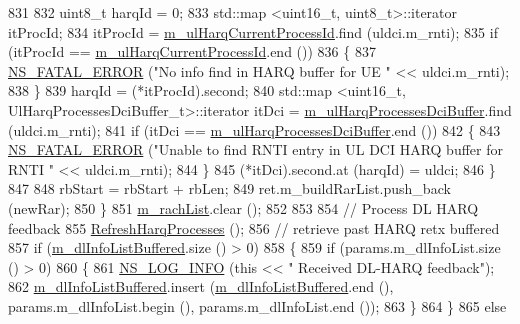 \begin{DoxyCode}
831 
832           uint8\_t harqId = 0;
833           std::map <uint16\_t, uint8\_t>::iterator itProcId;
834           itProcId = \hyperlink{classns3_1_1FdTbfqFfMacScheduler_a36b22976070611aa3fdd5c573f891dc2}{m\_ulHarqCurrentProcessId}.find (uldci.m\_rnti);
835           \textcolor{keywordflow}{if} (itProcId == \hyperlink{classns3_1_1FdTbfqFfMacScheduler_a36b22976070611aa3fdd5c573f891dc2}{m\_ulHarqCurrentProcessId}.end ())
836             \{
837               \hyperlink{group__fatal_ga5131d5e3f75d7d4cbfd706ac456fdc85}{NS\_FATAL\_ERROR} (\textcolor{stringliteral}{"No info find in HARQ buffer for UE "} << uldci.m\_rnti);
838             \}
839           harqId = (*itProcId).second;
840           std::map <uint16\_t, UlHarqProcessesDciBuffer\_t>::iterator itDci = 
      \hyperlink{classns3_1_1FdTbfqFfMacScheduler_a8566c4093902c1a4c227fa795fa90756}{m\_ulHarqProcessesDciBuffer}.find (uldci.m\_rnti);
841           \textcolor{keywordflow}{if} (itDci == \hyperlink{classns3_1_1FdTbfqFfMacScheduler_a8566c4093902c1a4c227fa795fa90756}{m\_ulHarqProcessesDciBuffer}.end ())
842             \{
843               \hyperlink{group__fatal_ga5131d5e3f75d7d4cbfd706ac456fdc85}{NS\_FATAL\_ERROR} (\textcolor{stringliteral}{"Unable to find RNTI entry in UL DCI HARQ buffer for RNTI "} << 
      uldci.m\_rnti);
844             \}
845           (*itDci).second.at (harqId) = uldci;
846         \}
847 
848       rbStart = rbStart + rbLen;
849       ret.m\_buildRarList.push\_back (newRar);
850     \}
851   \hyperlink{classns3_1_1FdTbfqFfMacScheduler_a0d2d08dad69997d048c8d35b5dac76e7}{m\_rachList}.clear ();
852 
853 
854   \textcolor{comment}{// Process DL HARQ feedback}
855   \hyperlink{classns3_1_1FdTbfqFfMacScheduler_a3c8688dfe09de01251cc4d15a4f620c6}{RefreshHarqProcesses} ();
856   \textcolor{comment}{// retrieve past HARQ retx buffered}
857   \textcolor{keywordflow}{if} (\hyperlink{classns3_1_1FdTbfqFfMacScheduler_a72f4bdca7a08fcc26b1618bb9e2d0cf3}{m\_dlInfoListBuffered}.size () > 0)
858     \{
859       \textcolor{keywordflow}{if} (params.m\_dlInfoList.size () > 0)
860         \{
861           \hyperlink{group__logging_gafbd73ee2cf9f26b319f49086d8e860fb}{NS\_LOG\_INFO} (\textcolor{keyword}{this} << \textcolor{stringliteral}{" Received DL-HARQ feedback"});
862           \hyperlink{classns3_1_1FdTbfqFfMacScheduler_a72f4bdca7a08fcc26b1618bb9e2d0cf3}{m\_dlInfoListBuffered}.insert (\hyperlink{classns3_1_1FdTbfqFfMacScheduler_a72f4bdca7a08fcc26b1618bb9e2d0cf3}{m\_dlInfoListBuffered}.end (),
       params.m\_dlInfoList.begin (), params.m\_dlInfoList.end ());
863         \}
864     \}
865   \textcolor{keywordflow}{else}

\end{DoxyCode}
